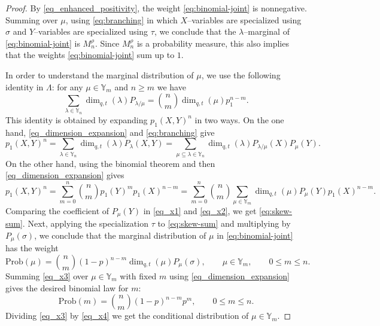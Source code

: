 \documentclass[11pt,reqno]{amsart}
\theoremstyle{definition}
\theoremstyle{remark}
\numberwithin{equation}{section}
\newcommand{\Y}{\mathbb Y}
\newcommand{\ddim}{\operatorname{dim}_{q,t}}
\begin{document}
\begin{proof}
 By \eqref{eq_enhanced_positivity}, the weight \eqref{eq:binomial-joint} is nonnegative. Summing over $\mu$, using \eqref{eq:branching} in which $X$--variables are specialized using $\sigma$ and $Y$--variables are specialized using $\tau$, we conclude that the $\lambda$--marginal of \eqref{eq:binomial-joint} is $M_n^\rho$. Since $M_n^\rho$ is a probability measure, this also implies that the weights \eqref{eq:binomial-joint} sum up to $1$.
 
 In order to understand the marginal distribution of $\mu$, we use the following identity in $\Lambda$: for any $\mu\in\Y_m$ and $n\ge m$ we have
 \begin{equation}\label{eq:skew-sum}
 \sum_{\lambda\in\Y_n}\ddim(\lambda)P_{\lambda/\mu}
 ={n\choose m}\ddim(\mu)p_1^{n-m}.
 \end{equation}
 This identity is obtained by expanding $p_1(X,Y)^n$ in two ways. On the one hand, \eqref{eq_dimension_expansion} and \eqref{eq:branching} give
 \begin{equation}
 \label{eq_x1}
 p_1(X,Y)^n=\sum_{\lambda\in\Y_n}\ddim(\lambda)P_\lambda(X,Y)=\sum_{\mu\subseteq\lambda\in\Y_n} \ddim(\lambda) P_{\lambda/\mu}(X) P_\mu(Y).
 \end{equation}
 On the other hand, using the binomial theorem and then \eqref{eq_dimension_expansion} gives
 \begin{equation}
 \label{eq_x2}
  p_1(X,Y)^n=\sum_{m=0}^n {n\choose m} p_1(Y)^m p_1(X)^{n-m}= \sum_{m=0}^n  {n\choose m} \sum_{\mu\in \Y_m} \ddim(\mu)P_\mu(Y) p_1(X)^{n-m}.
 \end{equation}
 Comparing the coefficient of $P_\mu(Y)$ in \eqref{eq_x1} and \eqref{eq_x2}, we get \eqref{eq:skew-sum}. Next, applying the specialization $\tau$ to \eqref{eq:skew-sum} and multiplying by $P_\mu(\sigma)$, we conclude that the marginal distribution of $\mu$ in \eqref{eq:binomial-joint} has the weight
 \begin{equation}
 \label{eq_x3}
  \mathrm{Prob}(\mu)= {n\choose m}  (1-p)^{n-m} \ddim(\mu) P_\mu(\sigma), \qquad \mu\in \Y_m, \qquad 0\le m \le n.
 \end{equation}
 Summing \eqref{eq_x3} over $\mu\in \Y_m$ with fixed $m$ using \eqref{eq_dimension_expansion} gives the desired binomial law for $m$:
 \begin{equation}
 \label{eq_x4}
  \mathrm{Prob}(m)= {n\choose m}  (1-p)^{n-m} p^m, \qquad 0\le m \le n.
 \end{equation}
 Dividing \eqref{eq_x3} by \eqref{eq_x4} we get the conditional distribution of $\mu\in\Y_m$.
\end{proof}
\end{document}
